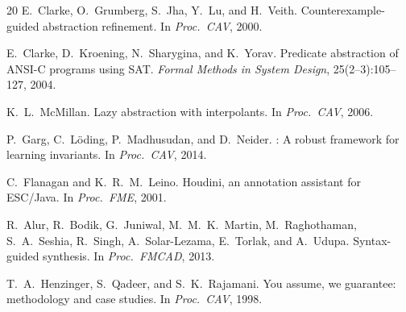 \documentclass[sigconf,review,anonymous]{acmart}
\begin{document}
\begin{thebibliography}{20}
E.~Clarke, O.~Grumberg, S.~Jha, Y.~Lu, and H.~Veith.
\newblock Counterexample-guided abstraction refinement.
\newblock In \emph{Proc.\ CAV}, 2000.

E.~Clarke, D.~Kroening, N.~Sharygina, and K.~Yorav.
\newblock Predicate abstraction of {ANSI-C} programs using {SAT}.
\newblock \emph{Formal Methods in System Design}, 25(2--3):105--127, 2004.

K.~L.~McMillan.
\newblock Lazy abstraction with interpolants.
\newblock In \emph{Proc.\ CAV}, 2006.

P.~Garg, C.~L\"oding, P.~Madhusudan, and D.~Neider.
: A robust framework for learning invariants.
\newblock In \emph{Proc.\ CAV}, 2014.

C.~Flanagan and K.~R.~M.~Leino.
\newblock Houdini, an annotation assistant for {ESC/Java}.
\newblock In \emph{Proc.\ FME}, 2001.

R.~Alur, R.~Bodik, G.~Juniwal, M.~M.~K.~Martin, M.~Raghothaman, S.~A.~Seshia, R.~Singh, A.~Solar-Lezama, E.~Torlak, and A.~Udupa.
\newblock Syntax-guided synthesis.
\newblock In \emph{Proc.\ FMCAD}, 2013.

T.~A.~Henzinger, S.~Qadeer, and S.~K.~Rajamani.
\newblock You assume, we guarantee: methodology and case studies.
\newblock In \emph{Proc.\ CAV}, 1998.

\end{thebibliography}
\end{document}
